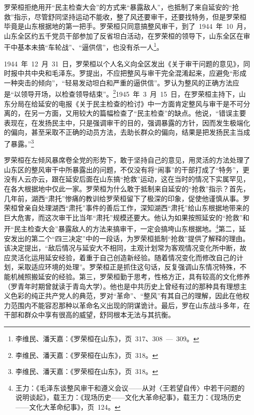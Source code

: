 罗荣桓拒绝用开“民主检查大会”的方式来“暴露敌人”，也抵制了来自延安的“抢救”指示，尽管舒同坚持运动不能收，整了风还要审干，还要找特务，但是罗荣桓毕竟是山东根据地的第一把手。罗荣桓只同意搞整风审干，到了~1944~年~10~月，山东全区约五千党员干部参加了反省坦白活动，在罗荣桓的领导下，山东全区在审干中基本未搞“车轮战”、“逼供信”，也没有杀一人\footnote{李维民、潘天嘉：《罗荣桓在山东》，页~317、308~—~309。}。

1944~年~12~月~31~日，罗荣桓以个人名义向全区发出《关于审干问题的意见》，同时报中共中央和毛泽东。罗提出，不应把整风与审干完全混淆起来，应避免“形成一种突击的倾向”，“轻易发动坦白和严重的逼供信”。罗认为整风的正确方法应是“以领导开场，以检查领导结束”。\footnote{李维民、潘天嘉：《罗荣桓在山东》，页~318。}1945~年~3~月~15~日，在罗荣桓主持下，山东分局在给延安的电报《关于民主检查的检讨》中一方面肯定整风与审干是不可分离的，在另一方面，又用较大的篇幅检查了“民主检查”的缺点。他说，“错误主要表现在，在发扬民主中，只是强调审干的目的，强调暴露的方针，因而发生极端化的偏向，甚至采取不正确的动员方法，去助长群众的偏向，结果是把发扬民主当成了暴露。”\footnote{李维民、潘天嘉：《罗荣桓在山东》，页~318。}

罗荣桓在左倾风暴席卷全党的形势下，敢于坚持自己的意见，用灵活的方法处理了山东区的整风审干中所暴露出的问题，不仅没有将“闹事”的干部打成了“特务”，更没有人云亦云，跟在延安后面在山东搞“抢救”运动，这在当时的情况下实属罕见，在各大根据地中仅此一家。罗荣桓为什么敢于抵制来自延安的“抢救”指示？首先，几年前，湖西“肃托”惨痛的教训给罗荣桓留下了极深的印象，促使他谨慎从事。罗荣桓曾亲自处理湖西“肃托”事件的善后工作，深知湖西“肃托”给山东根据地带来的巨大危害，而这次审干比当年“肃托”规模还要大。他认为如果按照延安的“抢救”和开“民主检查大会”暴露敌人的方法来搞审干，一定会搞垮山东根据地。\footnote{王力：《毛泽东谈整风审干和遵义会议——从对〈王若望自传〉中若干问题的说明谈起》，载王力：《现场历史——文化大革命纪事》，载王力：《现场历史——文化大革命纪事》，页~124。}第二，延安发出的第二个“四三决定”中的一段话，为罗荣桓抵制“抢救”提供了解释的理由。该决定提出，“敌后情况与延安大不相同，主观计划常为客观情况变化所中断，故应灵活化运用延安经验，着重于自己创造新经验。随着情况变化而修改自己的计划，采取适应环境的处理”。罗荣桓正是抓住这句话，反复强调山东情况特殊，不能机械照搬延安的经验。第三，罗荣桓勤于思考，性格方正，具有较高的文化修养（罗青年时期曾就读于青岛大学）。他也是中共历史上曾经有过的那种具有理想主义色彩的纯正共产党人的典范，罗对“革命”、“整风”有其自己的理解，因此在他权力范围内不能容忍那种以革命名义出现的阴谋诡计。最后，罗在山东战斗多年，在干部和群众中享有很高的威望，舒同根本无法与其抗衡。

